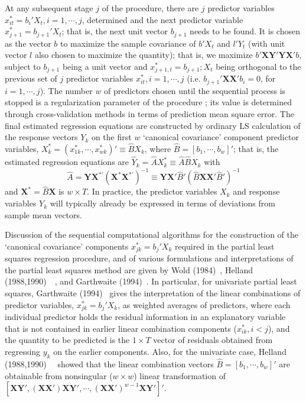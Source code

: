 At any subsequent stage $j$ of the procedure, there are $j$ predictor variables $x_{it}^*= b_i' X_t, i=1,\cdots,j$, determined and the next predictor variable $x_{j+1}^*= b_{j+1}'X_t$; that is, the next unit vector $b_{j+1}$ needs to be found. It is chosen as the vector $b$ to maximize the sample covariance of $b'X_t$ and $l' Y_t$ (with unit vector $l$ also chosen to maximize the quantity); that is, we maximize $b' \mathbf{XY'YX'}b$, subject to $b_{j+1}$ being a unit vector and $x_{j+1,t}^*=b_{j+1}; X_t$ being orthogonal to the previous set of $j$ predictor variables $x_{it}^*, i=1,\cdots,j$ (i.e. $b_{j+1}' \mathbf{XX'} b_i=0$, for $i=1,\cdots,j$). The number $w$ of predictors chosen until the sequential process is stopped is a regularization parameter of the procedure ; its value is determined through cross-validation methods in terms of prediction mean square error. The final estimated regression equations are constructed by ordinary LS calculation of the response vectors $Y_k$ on the first $w$ `canonical covariance' component predictor variables, $X_k^*=(x_{1k}^*,\cdots,x_{wk}^*)' \equiv \hat{B} X_k$, where $\hat{B}=[b_1,\cdots,b_w]'$; that is, the estimated regression equations are $\hat{Y}_k= \hat{A}X_k^* \equiv \hat{A}\hat{B} X_k$ with
	\[
	\hat{A}=\mathbf{YX}^{*'} (\mathbf{X}^* \mathbf{X}^{*'})^{-1} \equiv \mathbf{YX'} \hat{B}' (\hat{B} \mathbf{XX'} \hat{B}')^{-1}
	\]
and $\mathbf{X}^*=\hat{B}\mathbf{X}$ is $w \times T$. In practice, the predictor variables $X_k$ and response variables $Y_k$ will typically already be expressed in terms of deviations from sample mean vectors.


Discussion of the sequential computational algorithms for the construction of the `canonical covariance' components $x_{jk}^*=b_j'X_k$ required in the partial least squares regression procedure, and of various formulations and interpretations of the partial least squares method are given by Wold (1984)~\cite{wold}, Helland (1988,1990)~\cite{helland88}~\cite{helland90}, and Garthwaite (1994)~\cite{garth}. In particular, for univariate partial least squares, Garthwaite (1994)~\cite{garth} gives the interpretation of the linear combinations of predictor variables, $x_{jk}^*=b_j'X_k$, as weighted averages of predictors, where each individual predictor holds the residual information in an explanatory variable that is not contained in earlier linear combination components ($x_{ik}^*, i<j$), and the quantity to be predicted is the $1 \times T$ vector of residuals obtained from regressing $y_k$ on the earlier components. Also, for the univariate case, Helland (1988,1990)~\cite{helland88}~\cite{helland90} showed that the linear combination vectors $\hat{B}=[b_1,\cdots,b_w]'$ are obtainable from nonsingular ($w \times w$) linear transformation of $[\mathbf{XY'}, (\mathbf{XX'})\mathbf{XY'},\cdots,(\mathbf{XX'})^{w-1} \mathbf{XY'}]'$. 


